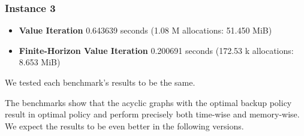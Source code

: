 \subsubsection{Instance 3}

\begin{itemize}
    \item \textbf{Value Iteration} 0.643639 seconds (1.08 M allocations: 51.450 MiB)
    \item \textbf{Finite-Horizon Value Iteration}   0.200691 seconds (172.53 k allocations: 8.653 MiB)
\end{itemize}  

We tested each benchmark's results to be the same.

The benchmarks show that the acyclic graphs with the optimal backup policy result in optimal policy and perform precisely both time-wise and memory-wise. We expect the results to be even better in the following versions.